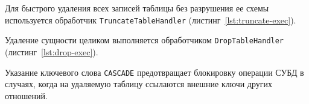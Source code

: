 Для быстрого удаления всех записей таблицы без разрушения ее схемы используется обработчик \texttt{TruncateTableHandler} (листинг~\ref{lst:truncate-exec}).

\begin{listing}[H]
    \caption{Сборка и исполнение команды \texttt{TRUNCATE TABLE}}
    \label{lst:truncate-exec}
\end{listing}

Удаление сущности целиком выполняется обработчиком \texttt{DropTableHandler} (листинг~\ref{lst:drop-exec}).

\begin{listing}[H]
    \caption{Сборка и исполнение команды \texttt{DROP TABLE}}
    \label{lst:drop-exec}
\end{listing}

Указание ключевого слова \texttt{CASCADE} предотвращает блокировку операции СУБД в случаях, когда на удаляемую таблицу ссылаются внешние ключи других отношений.
